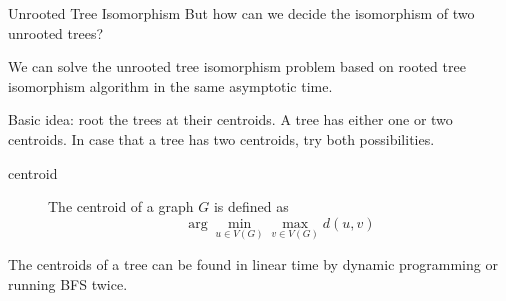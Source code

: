 \documentclass{beamer}
\begin{document}
\begin{frame}{Unrooted Tree Isomorphism}
  But how can we decide the isomorphism of two unrooted trees?
  
  \pause
  \begin{theorem}
  	We can solve the unrooted tree isomorphism problem based on rooted tree isomorphism algorithm in the same asymptotic time.
  \end{theorem}
  
  Basic idea: root the trees at their centroids. A tree has either one or two centroids. In case that a tree has two centroids, try both possibilities.
  
  \pause
  \begin{description}
  	\item[centroid] The centroid of a graph $G$ is defined as 
  	$$ \arg\min_{u \in V(G)} \max_{v \in V(G)} d(u, v) $$
  \end{description}
  
  \pause
  The centroids of a tree can be found in linear time by dynamic programming or running BFS twice.
\end{frame}
\end{document}
